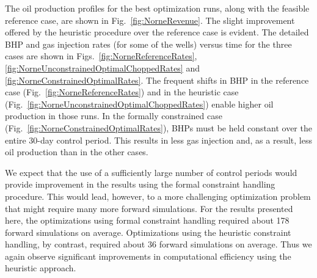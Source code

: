 \documentclass[twocolumn,numbook]{svjour3}          %
\begin{document}
The oil production profiles for the best optimization runs, along with the
feasible reference case, are shown in Fig.~\ref{fig:NorneRevenue}. The slight
improvement offered by the heuristic procedure over the reference case is
evident. The detailed BHP and gas injection rates (for some of the wells) versus time for the three
cases are shown in Figs.~\ref{fig:NorneReferenceRates},
\ref{fig:NorneUnconstrainedOptimalChoppedRates} and
\ref{fig:NorneConstrainedOptimalRates}. The frequent shifts in BHP in the
reference case (Fig.~\ref{fig:NorneReferenceRates}) and in the heuristic
case (Fig.~\ref{fig:NorneUnconstrainedOptimalChoppedRates}) enable higher
oil production in those runs. In the formally constrained case
(Fig.~\ref{fig:NorneConstrainedOptimalRates}), BHPs must be held constant over
the entire 30-day control period. This results in less gas injection and, as a
result, less oil production than in the other cases.


We expect that the use of a sufficiently large number of control periods would
provide improvement in the results using the formal constraint handling
procedure. This would lead, however, to a more challenging optimization problem
that might require many more forward simulations. 
For the results presented
here, the optimizations using formal constraint handling required about 178
forward simulations on average. Optimizations using the heuristic constraint
handling, by contrast, required about 36 forward simulations on average. Thus we
again observe significant improvements in computational efficiency using the
heuristic approach.
\end{document}
